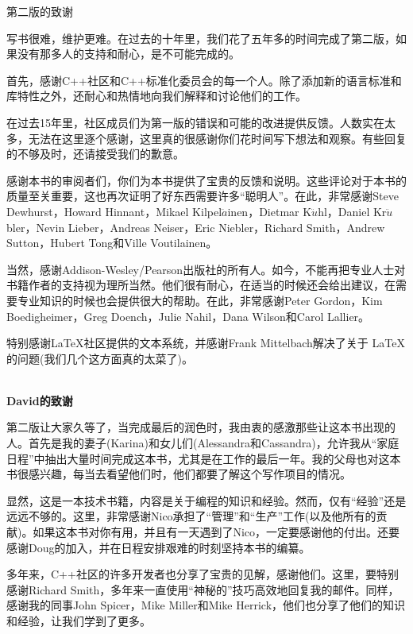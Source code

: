\begin{flushright}
 第二版的致谢
\end{flushright}

写书很难，维护更难。在过去的十年里，我们花了五年多的时间完成了第二版，如果没有那多人的支持和耐心，是不可能完成的。

首先，感谢C++社区和C++标准化委员会的每一个人。除了添加新的语言标准和库特性之外，还耐心和热情地向我们解释和讨论他们的工作。

在过去15年里，社区成员们为第一版的错误和可能的改进提供反馈。人数实在太多，无法在这里逐个感谢，这里真的很感谢你们花时间写下想法和观察。有些回复的不够及时，还请接受我们的歉意。

感谢本书的审阅者们，你们为本书提供了宝贵的反馈和说明。这些评论对于本书的质量至关重要，这也再次证明了好东西需要许多“聪明人”。在此，非常感谢Steve Dewhurst，Howard Hinnant，Mikael Kilpel$\ddot{a}$inen，Dietmar K$\ddot{u}$hl，Daniel Kr$\ddot{u}$bler，Nevin Lieber，Andreas Neiser，Eric Niebler，Richard Smith，Andrew Sutton，Hubert Tong和Ville Voutilainen。

当然，感谢Addison-Wesley/Pearson出版社的所有人。如今，不能再把专业人士对书籍作者的支持视为理所当然。他们很有耐心，在适当的时候还会给出建议，在需要专业知识的时候也会提供很大的帮助。在此，非常感谢Peter Gordon，Kim Boedigheimer，Greg Doench，Julie Nahil，Dana
Wilson和Carol Lallier。

特别感谢LaTeX社区提供的文本系统，并感谢Frank Mittelbach解决了关于 \LaTeX 的问题(我们几个这方面真的太菜了)。

\hspace*{\fill} \\ %
\noindent\textbf{David的致谢}

第二版让大家久等了，当完成最后的润色时，我由衷的感激那些让这本书出现的人。首先是我的妻子(Karina)和女儿们(Alessandra和Cassandra)，允许我从“家庭日程”中抽出大量时间完成这本书，尤其是在工作的最后一年。我的父母也对这本书很感兴趣，每当去看望他们时，他们都要了解这个写作项目的情况。

显然，这是一本技术书籍，内容是关于编程的知识和经验。然而，仅有“经验”还是远远不够的。这里，非常感谢Nico承担了“管理”和“生产”工作(以及他所有的贡献)。如果这本书对你有用，并且有一天遇到了Nico，一定要感谢他的付出。还要感谢Doug的加入，并在日程安排艰难的时刻坚持本书的编纂。

多年来，C++社区的许多开发者也分享了宝贵的见解，感谢他们。这里，要特别感谢Richard Smith，多年来一直使用“神秘的”技巧高效地回复我的邮件。同样，感谢我的同事John Spicer，Mike Miller和Mike Herrick，他们也分享了他们的知识和经验，让我们学到了更多。


